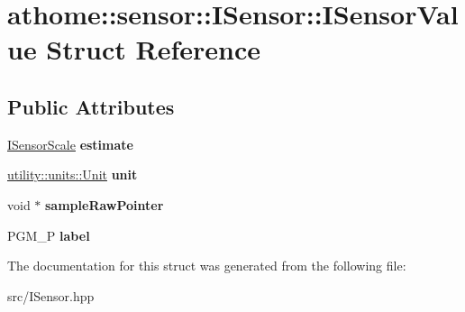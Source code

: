 \hypertarget{structathome_1_1sensor_1_1_i_sensor_1_1_i_sensor_value}{}\section{athome\+:\+:sensor\+:\+:I\+Sensor\+:\+:I\+Sensor\+Value Struct Reference}
\label{structathome_1_1sensor_1_1_i_sensor_1_1_i_sensor_value}
\subsection*{Public Attributes}
\begin{DoxyCompactItemize}
\item 
\mbox{\label{structathome_1_1sensor_1_1_i_sensor_1_1_i_sensor_value_a3f5ef42b7996bf59549e80fd95dcaa87}} 
\mbox{\hyperlink{classathome_1_1sensor_1_1_i_sensor_aa70bc27a4c17c86caf96cca776541ddf}{I\+Sensor\+Scale}} {\bfseries estimate}
\item 
\mbox{\label{structathome_1_1sensor_1_1_i_sensor_1_1_i_sensor_value_a35ceaf0b4f9e3586a154b33b00e8e83d}} 
\mbox{\hyperlink{structathome_1_1utility_1_1units_1_1_unit}{utility\+::units\+::\+Unit}} {\bfseries unit}
\item 
\mbox{\label{structathome_1_1sensor_1_1_i_sensor_1_1_i_sensor_value_a3afa32e47ab7c385a51f55bcb6597ae7}} 
void $\ast$ {\bfseries sample\+Raw\+Pointer}
\item 
\mbox{\label{structathome_1_1sensor_1_1_i_sensor_1_1_i_sensor_value_a8eeef7fadc2c6b97ff8d1279f655d038}} 
P\+G\+M\+\_\+P {\bfseries label}
\end{DoxyCompactItemize}


The documentation for this struct was generated from the following file\+:\begin{DoxyCompactItemize}
\item 
src/I\+Sensor.\+hpp\end{DoxyCompactItemize}
